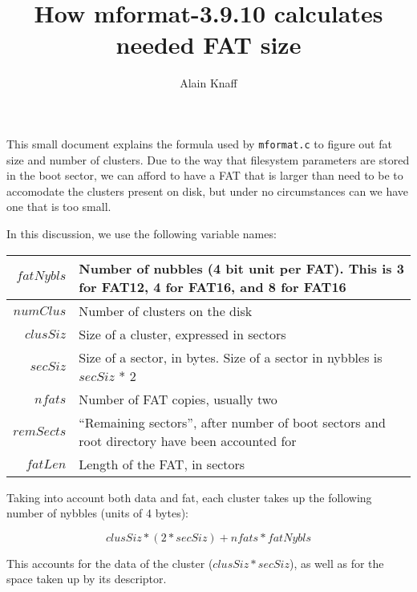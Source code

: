 \documentclass[a4paper,12pt]{article}
\author{Alain Knaff}
\title{How mformat-3.9.10 calculates needed FAT size}
\begin{document}
\maketitle

This small document explains the formula used by {\tt mformat.c} to
figure out fat size and number of clusters. Due to the way that
filesystem parameters are stored in the boot sector, we can afford to
have a FAT that is larger than need to be to accomodate the clusters
present on disk, but under no circumstances can we have one that is
too small.

In this discussion, we use the following variable names:

\begin{tabular}{|r|p{12cm}|}

\hline

$fatNybls$&
Number of nubbles (4 bit unit per FAT). This is 3 for FAT12, 4 for
FAT16, and 8 for FAT16\\

\hline

$numClus$&
Number of clusters on the disk\\

\hline

$clusSiz$&
Size of a cluster, expressed in sectors\\

\hline

$secSiz$&
Size of a sector, in bytes. Size of a sector in nybbles is $secSiz$ * 2\\

\hline

$nfats$&
Number of FAT copies, usually two\\

\hline

$remSects$&
``Remaining sectors'', after number of boot sectors and root directory
have been accounted for\\

\hline

$fatLen$&
Length of the FAT, in sectors\\

\hline


\end{tabular}


Taking into account both data and fat, each cluster takes up the
following number of nybbles (units of 4 bytes):


$$clusSiz * (2*secSiz)  + nfats * fatNybls$$
	
This accounts for the data of the cluster ($clusSiz * secSiz$),
as well as for the space taken up by its descriptor.
\end{document}
